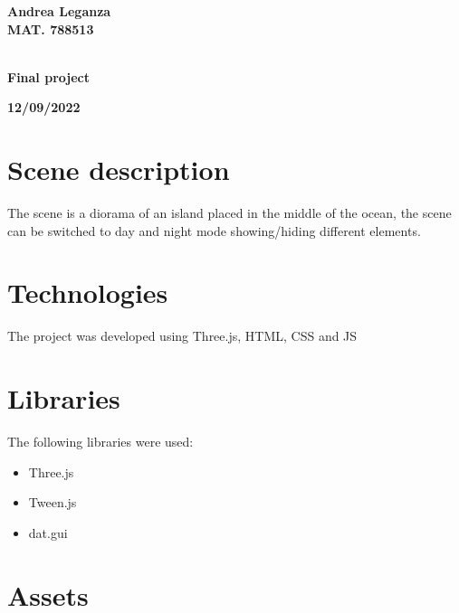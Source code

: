 \documentclass[10pt,a4paper]{article}
\begin{document}
\begin{titlepage}
\vspace{15mm}
\begin{center}
{\LARGE{\bf Andrea Leganza}}\\
\vspace{3mm}
{\LARGE{\bf MAT. 788513}}\\
\vspace{3mm}
{\LARGE{\bf\ }}\\
\end{center}
\vspace{40mm}
\par
\noindent
\begin{minipage}[t]{0.47\textwidth}
{\large{\bf}}
\end{minipage}
\hfill
\begin{center}
{\large{\bf Final project }}
\end{center}
\vspace{20mm}
\begin{center}
{\large{\bf 12/09/2022}}
\end{center}
\end{titlepage}
\pagebreak


\section{Scene description}
The scene is a diorama of an island placed in the middle of the ocean, the scene can be switched to day and night mode showing/hiding different elements.

\section{Technologies}

The project was developed using Three.js, HTML, CSS and JS

\section{Libraries}

The following libraries were used:

\begin{itemize}
 \item Three.js
 \item Tween.js
 \item dat.gui
\end{itemize}

\section{Assets}
\end{document}
